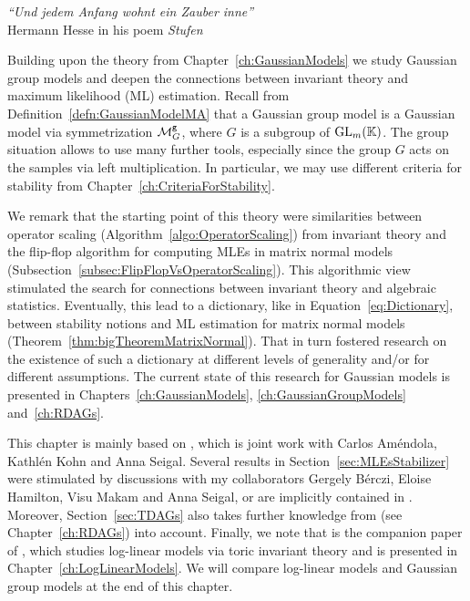 


\begin{center}
	\emph{``Und jedem Anfang wohnt ein Zauber inne''}
\\ \bigskip
Hermann Hesse in his poem \emph{Stufen}
\end{center}

\vspace{1cm}

Building upon the theory from Chapter~\ref{ch:GaussianModels} we study Gaussian group models and deepen the connections between invariant theory and maximum likelihood (ML) estimation. Recall from Definition~\ref{defn:GaussianModelMA} that a Gaussian group model is a Gaussian model via symmetrization $\mathcal{M}^{\mathtt{g}}_G$, where $G$ is a subgroup of $\operatorname{GL}_m(\mathbb K)$. The group situation allows to use many further tools, especially since the group $G$ acts on the samples via left multiplication. In particular, we may use different criteria for stability from Chapter~\ref{ch:CriteriaForStability}.

We remark that the starting point of this theory were similarities between operator scaling (Algorithm~\ref{algo:OperatorScaling}) from invariant theory and the flip-flop algorithm for computing MLEs in matrix normal models (Subsection~\ref{subsec:FlipFlopVsOperatorScaling}). This algorithmic view stimulated the search for connections between invariant theory and algebraic statistics. Eventually, this lead to a dictionary, like in Equation~\eqref{eq:Dictionary}, between stability notions and ML estimation for matrix normal models (Theorem~\ref{thm:bigTheoremMatrixNormal}). That in turn fostered research on the existence of such a dictionary at different levels of generality and/or for different assumptions. The current state of this research for Gaussian models is presented in Chapters~\ref{ch:GaussianModels}, \ref{ch:GaussianGroupModels} and~\ref{ch:RDAGs}.

This chapter is mainly based on \cite{SiagaPaper}, which is joint work with Carlos Am\'endola, Kathl\'en Kohn and Anna Seigal. Several  results in Section~\ref{sec:MLEsStabilizer} were stimulated by discussions with my collaborators Gergely B\'erczi, Eloise Hamilton, Visu Makam and Anna Seigal, or are implicitly contained in \cite{SiagaPaper}. Moreover, Section~\ref{sec:TDAGs} also takes further knowledge from \cite{RDAG} (see Chapter~\ref{ch:RDAGs}) into account. Finally, we note that \cite{SiagaPaper} is the companion paper of \cite{DiscretePaper}, which studies log-linear models via toric invariant theory and is presented in Chapter~\ref{ch:LogLinearModels}. We will compare log-linear models and Gaussian group models at the end of this chapter.


